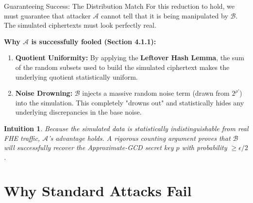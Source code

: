\documentclass[10pt, aspectratio=169]{beamer}
\newtheorem{intuition}{Intuition}
\begin{document}
\begin{frame}{Guaranteeing Success: The Distribution Match}
    For this reduction to hold, we must guarantee that attacker $\mathcal{A}$ cannot tell that it is being manipulated by $\mathcal{B}$. The simulated ciphertexts must look perfectly real.
    \pause
    
    \vspace{0.3cm}
    \textbf{Why $\mathcal{A}$ is successfully fooled (Section 4.1.1):}
    \begin{enumerate}
        \item \textbf{Quotient Uniformity:} By applying the \textbf{Leftover Hash Lemma}, the sum of the random subsets used to build the simulated ciphertext makes the underlying quotient statistically uniform.
        \pause
        \item \textbf{Noise Drowning:} $\mathcal{B}$ injects a massive random noise term (drawn from $2^{\rho'}$) into the simulation. This completely "drowns out" and statistically hides any underlying discrepancies in the base noise.
    \end{enumerate}
    \pause
    
    \vspace{0.3cm}
    \begin{intuition}
    Because the simulated data is statistically indistinguishable from real FHE traffic, $\mathcal{A}$'s advantage holds. A rigorous counting argument proves that $\mathcal{B}$ will successfully recover the Approximate-GCD secret key $p$ with probability $\ge \epsilon/2$.
    \end{intuition}
\end{frame}

\section{Why Standard Attacks Fail}
\end{document}
